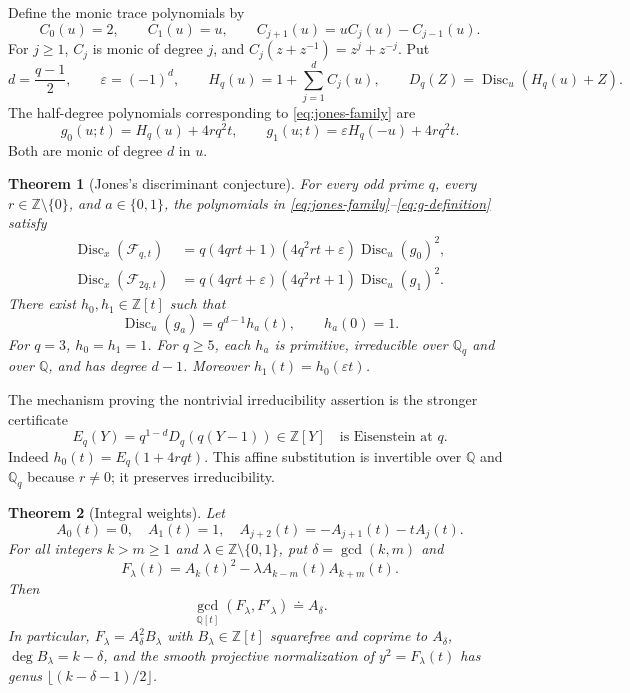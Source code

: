 \documentclass[11pt,a4paper]{article}
\newtheorem{theorem}{Theorem}[section]
\theoremstyle{definition}
\theoremstyle{remark}
\newcommand{\QQ}{\mathbb Q}
\newcommand{\ZZ}{\mathbb Z}
\newcommand{\Disc}{\operatorname{Disc}}
\begin{document}
Define the monic trace polynomials by
\begin{equation}\label{eq:trace-recurrence}
 C_0(u)=2,\qquad C_1(u)=u,\qquad
 C_{j+1}(u)=uC_j(u)-C_{j-1}(u).
\end{equation}
For $j\ge1$, $C_j$ is monic of degree $j$, and
$C_j(z+z^{-1})=z^j+z^{-j}$. Put
\begin{equation}\label{eq:H-definition}
 d=\frac{q-1}{2},\qquad \varepsilon=(-1)^d,\qquad
 H_q(u)=1+\sum_{j=1}^{d}C_j(u),\qquad
 D_q(Z)=\Disc_u(H_q(u)+Z).
\end{equation}
The half-degree polynomials corresponding to
\eqref{eq:jones-family} are
\begin{equation}\label{eq:g-definition}
 g_0(u;t)=H_q(u)+4rq^2t,\qquad
 g_1(u;t)=\varepsilon H_q(-u)+4rq^2t.
\end{equation}
Both are monic of degree $d$ in $u$.

\begin{theorem}[Jones's discriminant conjecture]\label{thm:jones}
For every odd prime $q$, every $r\in\ZZ\setminus\{0\}$, and
$a\in\{0,1\}$, the polynomials in
\eqref{eq:jones-family}--\eqref{eq:g-definition} satisfy
\begin{align}
 \Disc_x(\mathcal F_{q,t})
 &=q(4qrt+1)(4q^2rt+\varepsilon)\Disc_u(g_0)^2,
 \label{eq:jones-zero}\\
 \Disc_x(\mathcal F_{2q,t})
 &=q(4qrt+\varepsilon)(4q^2rt+1)\Disc_u(g_1)^2.
 \label{eq:jones-one}
\end{align}
There exist $h_0,h_1\in\ZZ[t]$ such that
\begin{equation}\label{eq:normalized-h}
 \Disc_u(g_a)=q^{d-1}h_a(t),\qquad h_a(0)=1.
\end{equation}
For $q=3$, $h_0=h_1=1$. For $q\ge5$, each $h_a$ is primitive,
irreducible over $\QQ_q$ and over $\QQ$, and has degree $d-1$.
Moreover $h_1(t)=h_0(\varepsilon t)$.
\end{theorem}

The mechanism proving the nontrivial irreducibility assertion is the
stronger certificate
\begin{equation}\label{eq:E-certificate}
 \boxed{E_q(Y)=q^{1-d}D_q(q(Y-1))\in\ZZ[Y]
 \quad\text{is Eisenstein at }q.}
\end{equation}
Indeed $h_0(t)=E_q(1+4rqt)$. This affine substitution is invertible
over $\QQ$ and $\QQ_q$ because $r\ne0$; it preserves irreducibility.

\begin{theorem}[Integral weights]\label{thm:integer-main}
Let
\[
 A_0(t)=0,\quad A_1(t)=1,\quad
 A_{j+2}(t)=-A_{j+1}(t)-tA_j(t).
\]
For all integers $k>m\ge1$ and
$\lambda\in\ZZ\setminus\{0,1\}$, put $\delta=\gcd(k,m)$ and
\[
 F_\lambda(t)=A_k(t)^2-\lambda A_{k-m}(t)A_{k+m}(t).
\]
Then
\begin{equation}\label{eq:integral-main}
 \gcd_{\QQ[t]}(F_\lambda,F'_\lambda)\doteq A_\delta.
\end{equation}
In particular, $F_\lambda=A_\delta^2B_\lambda$ with
$B_\lambda\in\ZZ[t]$ squarefree and coprime to $A_\delta$,
$\deg B_\lambda=k-\delta$, and the smooth projective normalization of
$y^2=F_\lambda(t)$ has genus
$\lfloor(k-\delta-1)/2\rfloor$.
\end{theorem}
\end{document}
